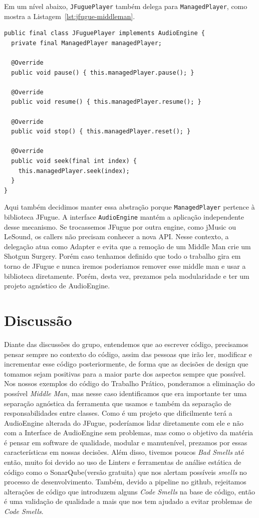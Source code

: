 \documentclass[12pt,a4paper]{article}
\newcommand{\smell}[1]{\textit{#1}}
\begin{document}
Em um nível abaixo, \texttt{JFuguePlayer} também delega para \texttt{ManagedPlayer}, como mostra a Listagem~\ref{lst:jfugue-middleman}.

\begin{lstlisting}[caption={Delegação mantida em JFuguePlayer},label={lst:jfugue-middleman}]
public final class JFuguePlayer implements AudioEngine {
  private final ManagedPlayer managedPlayer;

  @Override
  public void pause() { this.managedPlayer.pause(); }

  @Override
  public void resume() { this.managedPlayer.resume(); }

  @Override
  public void stop() { this.managedPlayer.reset(); }

  @Override
  public void seek(final int index) {
    this.managedPlayer.seek(index);
  }
}
\end{lstlisting}

Aqui também decidimos manter essa abstração porque \texttt{ManagedPlayer} pertence à biblioteca JFugue. A interface \texttt{AudioEngine} mantém a aplicação independente desse mecanismo. Se trocassemos JFugue por outra engine, como jMusic ou LeSound, os callers não precisam conhecer a nova API. Nesse contexto, a delegação atua como Adapter e evita que a remoção de um Middle Man crie um Shotgun Surgery. Porém caso tenhamos definido que todo o trabalho gira em torno de JFugue e nunca iremos poderiamos remover esse middle man e usar a biblioteca diretamente. Porém, desta vez, prezamos pela modularidade e ter um projeto agnóstico de AudioEngine.

\section{Discussão}

Diante das discussões do grupo, entendemos que ao escrever código, precisamos pensar sempre no contexto do código, assim das pessoas que irão ler, modificar e incrementar esse código posteriormente, de forma que as decisões de design que tomamos sejam positivas para a maior parte dos aspectos sempre que possível. Nos nossos exemplos do código do Trabalho Prático, ponderamos a eliminação do possível \smell{Middle Man}, mas nesse caso identificamos que era importante ter uma separação agnóstica da ferramenta que usamos e também da separação de responsabilidades entre classes. Como é um projeto que dificilmente terá a AudioEngine alterada do JFugue, poderíamos lidar diretamente com ele e não com a Interface de AudioEngine sem problemas, mas como o objetivo da matéria é pensar em software de qualidade, modular e manutenível, prezamos por essas características em nossas decisões. Além disso, tivemos poucos \smell{Bad Smells} até então, muito foi devido ao uso de Linters e ferramentas de análise estática de código como o SonarQube(versão gratuita) que nos alertam possíveis \smell{smells} no processo de desenvolvimento. Também, devido a pipeline no github, rejeitamos alterações de código que introduzem alguns \smell{Code Smells} na base de código, então é uma validação de qualidade a mais que nos tem ajudado a evitar problemas de \smell{Code Smells}.
\end{document}

